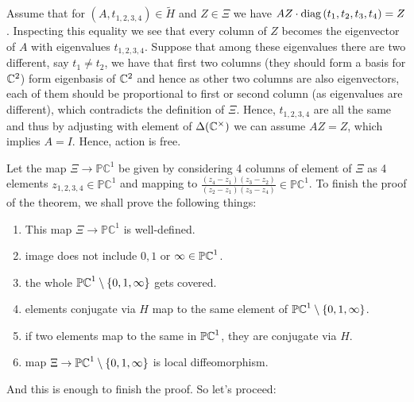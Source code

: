 \documentclass[8pt]{article} %
\newcommand{\diag}{\mbox{\normalfont{diag}}}
\begin{document}
	 Assume that for $(A,t_{ 1,2,3,4 })\in \widetilde{ H }$ and $Z\in \Xi$ we have $AZ\cdot\diag\mybra{ t_1,t_2,t_3,t_4 }=Z$.
		Inspecting this equality we see that every column of $Z$ becomes the eigenvector of $A$ with
		eigenvalues $t_{ 1,2,3,4 }$. Suppose that among these eigenvalues there are two different,
		say $t_1\neq t_2$, we have that first two columns (they should form a basis for $\mathbb{C}^2$)
		form eigenbasis of $\mathbb{C}^2$ and hence as other two columns are also eigenvectors, each of them
		should be proportional to first or second column (as eigenvalues are different), which contradicts
		the definition of $\Xi$. Hence, $t_{ 1,2,3,4 }$ are all the same and thus by adjusting with element
		of $\Delta({ \mathbb{C}^\times })$ we can assume $AZ=Z$, which implies $A=I$. Hence, action is free.\par
Let the map $\Xi\to\mathbb{ PC }^1$ be given by considering 4 columns of element of $\Xi$
as 4 elements $z_{ 1,2,3,4 }\in\mathbb{ PC }^1$ and mapping to $\frac{(z_4-z_1)(z_3-z_2)}{(z_2-z_1)(z_3-z_4)}\in\mathbb{PC}^1$.
To finish the proof of the theorem, we shall prove the following things:
\begin{enumerate}
	\item This map $\Xi\to\mathbb{ PC }^1$ is well-defined.
	\item image does not include $0,1$ or $\infty\in\mathbb{PC}^1$.
	\item the whole $\mathbb{PC}^1\setminus\left\{ 0,1,\infty\right\}$ gets covered.
	\item elements conjugate via $H$ map to the same element of $\mathbb{PC}^1\setminus\left\{ 0,1,\infty\right\}$.
	\item if two elements map to the same in $\mathbb{PC}^1$, they are conjugate via $H$.
	\item map $\Xi\to\mathbb{ PC }^1\setminus\left\{ 0,1,\infty\right\}$ is local diffeomorphism.
\end{enumerate}
And this is enough to finish the proof. So let's proceed:
\end{document}
